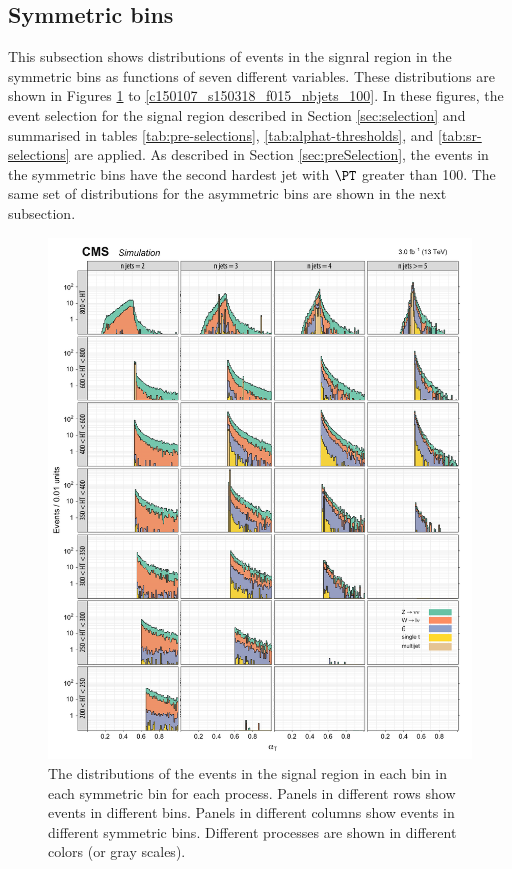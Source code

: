 \subsection{Symmetric \njet bins}

This subsection shows distributions of events in the signral region in
the symmetric \njet bins as functions of seven different variables.
These distributions are shown in Figures
\ref{c150107_s150318_f015_alphaT_100} to
\ref{c150107_s150318_f015_nbjets_100}. In these figures, the event
selection for the signal region described in Section
\ref{sec:selection} and summarised in tables \ref{tab:pre-selections},
\ref{tab:alphat-thresholds}, and \ref{tab:sr-selections} are applied.
As described in Section \ref{sec:preSelection}, the events in the
symmetric \njet bins have the second hardest jet with $\PT$ greater
than 100\gev. The same set of distributions for the asymmetric \njet
bins are shown in the next subsection.

\begin{figure}[!h]
\centering
\includegraphics[scale=0.95]{figures/kiplots/c150107_s150318_f015_alphaT_100}
\caption{The \alphat distributions of the events in the signal region
in each \scalht bin in each symmetric \njet bin for each process.
Panels in different rows show events in different \scalht bins. Panels
in different columns show events in different symmetric \njet bins.
Different processes are shown in different colors (or gray scales).}
\label{c150107_s150318_f015_alphaT_100}
\end{figure}

